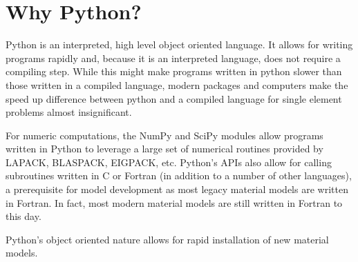\documentclass[pdf,ps2pdf,12pt,report,strict]{SANDreport/SANDreport}
\begin{document}
\section{Why Python?}
Python is an interpreted, high level object oriented language. It allows for
writing programs rapidly and, because it is an interpreted language, does not
require a compiling step. While this might make programs written in python
slower than those written in a compiled language, modern packages and
computers make the speed up difference between python and a compiled language
for single element problems almost insignificant.

For numeric computations, the NumPy and SciPy modules allow programs written
in Python to leverage a large set of numerical routines provided by LAPACK,
BLASPACK, EIGPACK, etc. Python's APIs also allow for calling subroutines
written in C or Fortran (in addition to a number of other languages), a
prerequisite for model development as most legacy material models are written
in Fortran. In fact, most modern material models are still written in Fortran
to this day.

Python's object oriented nature allows for rapid installation of new material
models.

\end{document}
